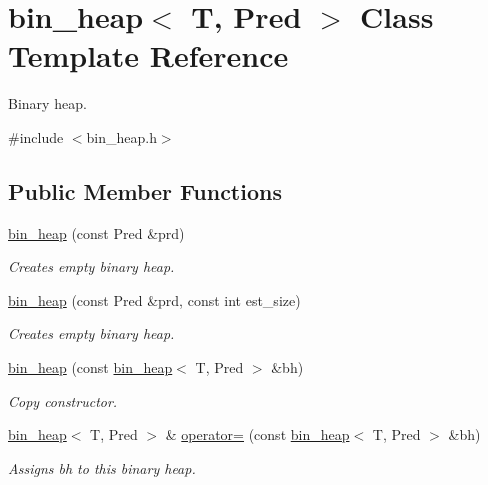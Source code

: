 \hypertarget{classbin__heap}{}\section{bin\+\_\+heap$<$ T, Pred $>$ Class Template Reference}
\label{classbin__heap}


Binary heap.  




{\ttfamily \#include $<$bin\+\_\+heap.\+h$>$}

\subsection*{Public Member Functions}
\begin{DoxyCompactItemize}
\item 
\mbox{\hyperlink{classbin__heap_a9de42b60fac4b0d38aa738522eb7c4cd}{bin\+\_\+heap}} (const Pred \&prd)
\begin{DoxyCompactList}\small\item\em Creates empty binary heap. \end{DoxyCompactList}\item 
\mbox{\hyperlink{classbin__heap_ab911dd559d9d9fd665b9fdf2d8202bb8}{bin\+\_\+heap}} (const Pred \&prd, const int est\+\_\+size)
\begin{DoxyCompactList}\small\item\em Creates empty binary heap. \end{DoxyCompactList}\item 
\mbox{\hyperlink{classbin__heap_a19bd4241e097852ffda83b72557ffbdc}{bin\+\_\+heap}} (const \mbox{\hyperlink{classbin__heap}{bin\+\_\+heap}}$<$ T, Pred $>$ \&bh)
\begin{DoxyCompactList}\small\item\em Copy constructor. \end{DoxyCompactList}\item 
\mbox{\hyperlink{classbin__heap}{bin\+\_\+heap}}$<$ T, Pred $>$ \& \mbox{\hyperlink{classbin__heap_ad31b6806316a272686015fcbf5f633cd}{operator=}} (const \mbox{\hyperlink{classbin__heap}{bin\+\_\+heap}}$<$ T, Pred $>$ \&bh)
\begin{DoxyCompactList}\small\item\em Assigns {\ttfamily bh} to this binary heap. \end{DoxyCompactList}\item 
\mbox{\label{classbin__heap_a5283db56783a84ee28dea9d393acf905}} 

\end{DoxyCompactItemize}
